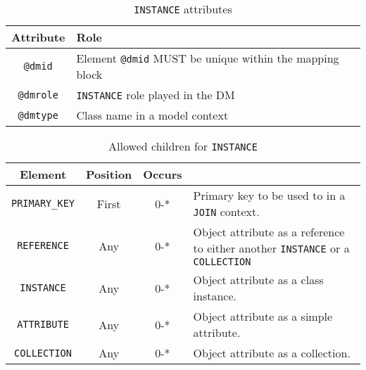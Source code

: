 \begin{table}[!htbp]
\small
\centering
\begin{tabulary}{\linewidth}{|c|J|}       
       \hline 
            \textbf{Attribute} & 
            \textbf {Role}\\
       \hline         \hline  
            \texttt{@dmid} & 
            Element  \texttt{@dmid}  MUST be unique within the mapping block  \\
        \hline 
            \texttt{@dmrole} & 
            \texttt{INSTANCE} role played in the DM \\
        \hline 
            \texttt{@dmtype} & 
            Class name in a model context\\
        \hline 
     \end{tabulary}
     \caption{\texttt{INSTANCE} attributes} 
     \label{tbl:instance-att}
 \end{table}   
 


 
\begin{table}[!htbp]
\small
\centering
\begin{tabulary}{\linewidth}{|c |c |c|J|}
    \hline 
        \textbf{Element} &
        \textbf{Position} &
        \textbf{Occurs} &
        \\
    \hline      \hline  
        \texttt{PRIMARY\_KEY}  &        
        First &           
        0-* &
        Primary key to be used to in a \texttt{JOIN} context.\\
    \hline    
        \texttt{REFERENCE}  &        
        Any &           
        0-* &
         Object attribute as a reference to either another \texttt{INSTANCE} or a \texttt{COLLECTION} \\
    \hline    
        \texttt{INSTANCE} &           
        Any &           
        0-* &
         Object attribute as a class instance. \\
    \hline    
        \texttt{ATTRIBUTE} &           
        Any &           
        0-* &
       Object attribute as a simple attribute. \\
    \hline    
        \texttt{COLLECTION} &           
        Any &           
        0-* &
         Object attribute  as a collection.\\
    \hline 
\end{tabulary}
     \caption{Allowed children for \texttt{INSTANCE}} 
     \label{tbl:instance-chilren}
\end{table}
 
